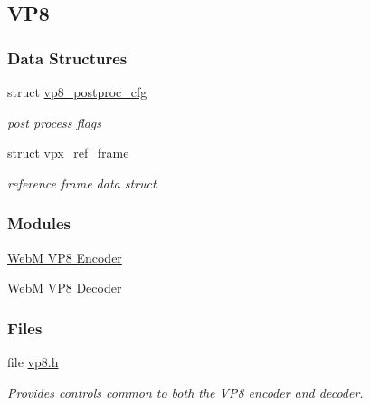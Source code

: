 \hypertarget{group__vp8}{
\subsection{\-V\-P8}
\label{group__vp8}
}
\subsubsection*{\-Data \-Structures}
\begin{DoxyCompactItemize}
\item 
struct \hyperlink{structvp8__postproc__cfg}{vp8\-\_\-postproc\-\_\-cfg}
\begin{DoxyCompactList}\small\item\em post process flags \end{DoxyCompactList}\item 
struct \hyperlink{structvpx__ref__frame}{vpx\-\_\-ref\-\_\-frame}
\begin{DoxyCompactList}\small\item\em reference frame data struct \end{DoxyCompactList}\end{DoxyCompactItemize}
\subsubsection*{\-Modules}
\begin{DoxyCompactItemize}
\item 
\hyperlink{group__vp8__encoder}{\-Web\-M V\-P8 Encoder}
\item 
\hyperlink{group__vp8__decoder}{\-Web\-M V\-P8 Decoder}
\end{DoxyCompactItemize}
\subsubsection*{\-Files}
\begin{DoxyCompactItemize}
\item 
file \hyperlink{vp8_8h}{vp8.\-h}
\begin{DoxyCompactList}\small\item\em \-Provides controls common to both the \-V\-P8 encoder and decoder. \end{DoxyCompactList}\end{DoxyCompactItemize}
